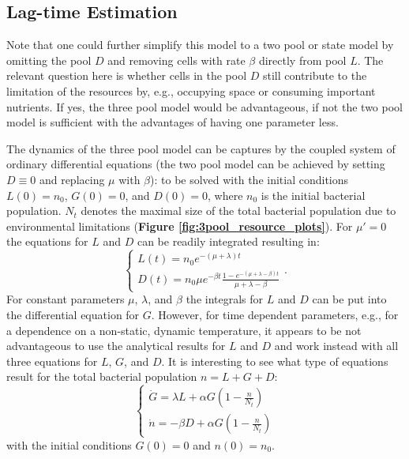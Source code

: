 \documentclass[10pt,A4paper]{article}
\begin{document}
\subsection{Lag-time Estimation}
Note that one could further simplify this model to a two pool or state model by omitting the pool $D$ and removing cells with rate $\beta$ directly from pool $L$. 
The relevant question here is whether cells in the pool $D$ still contribute to the limitation of the resources by, e.g., occupying space or consuming important nutrients. 
If yes, the three pool model would be advantageous, if not the two pool model is sufficient with the advantages of having one parameter less.

The dynamics of the three pool model can be captures by the coupled system of ordinary differential equations (the two pool model can be achieved by setting $D\equiv 0$ and replacing $\mu$ with $\beta$):
to be solved with the initial conditions $L(0)=n_0$, $G(0)=0$, and $D(0)=0$, where $n_0$ is the initial bacterial population. 
$N_t$ denotes the maximal size of the total bacterial population due to environmental limitations (\textbf{Figure \ref{fig:3pool_resource_plots}}). 
For $\mu'=0$ the equations for $L$ and $D$ can be readily integrated resulting in:
\begin{equation}
    \begin{cases}
        L(t) = n_0 e^{-(\mu+\lambda)t}\\
        D(t) = n_0 \mu e^{-\beta t}\frac{1-e^{-(\mu+\lambda-\beta)t}}{\mu+\lambda-\beta}
    \end{cases}.
\end{equation}
For constant parameters $\mu$, $\lambda$, and $\beta$ the integrals for $L$ and $D$ can be put into the differential equation for $G$. 
However, for time dependent parameters, e.g., for a dependence on a non-static, dynamic temperature, it appears to be not advantageous to use the analytical results for $L$ and $D$ and work instead with all three equations for $L$, $G$, and $D$. 
It is interesting to see what type of equations result for the total bacterial population $n=L+G+D$:
\begin{equation}
    \begin{cases}
        \dot{G} = \lambda L + \alpha G\left(1-\frac{n}{N_t}\right)\\
        \dot{n} = - \beta D + \alpha G\left(1-\frac{n}{N_t}\right)
    \end{cases}
\end{equation}
with the initial conditions $G(0)=0$ and $n(0)=n_0$. 
\end{document}
